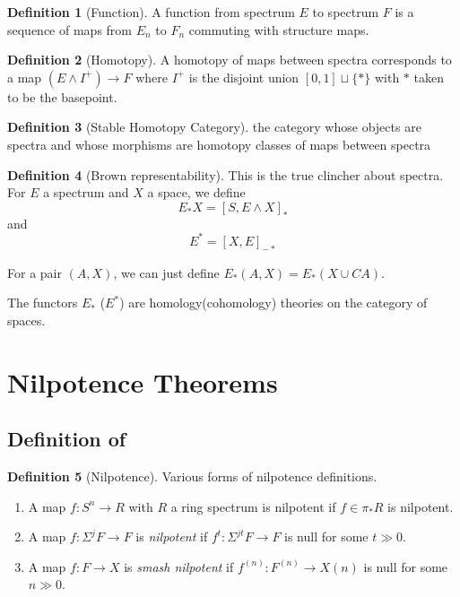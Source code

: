 \documentclass[11pt, oneside]{article}   	%
\theoremstyle{definition}
\newtheorem*{defn}{Definition}
\begin{document}
\begin{defn}[Function]
	A function from spectrum $E$ to spectrum $F$ is a sequence of maps from $E_n$ to $F_n$ commuting with structure maps.
\end{defn}

\begin{defn}[Homotopy]
	 A homotopy of maps between spectra corresponds to a map $(E\wedge I^+)\to F$ where $I^+$ is the disjoint union $[0,1]\sqcup \{*\}$ with $*$ taken to be the basepoint.
\end{defn}

\begin{defn}[Stable Homotopy Category]
	 the category whose objects are spectra and whose morphisms are homotopy classes of maps between spectra
\end{defn}

\begin{defn}[Brown representability]
	This is the true clincher about spectra. For $E$ a spectrum and $X$ a space, we define
	\begin{equation}
		E_*X=[S,E\wedge X]_*
	\end{equation}
	and
	\begin{equation}
		E^*=[X,E]_{-*}
	\end{equation}

	For a pair $(A,X)$, we can just define $E_*(A,X)=E_*(X\cup CA)$.

	The functors $E_*$ ($E^*$) are homology(cohomology) theories on the category of spaces.
\end{defn}

\section{Nilpotence Theorems}

\subsection{Definition of }

\begin{defn}[Nilpotence]
	Various forms of nilpotence definitions.

	\begin{enumerate}[1]
		\item A map $f:S^n\to R$ with $R$ a ring spectrum is nilpotent if $f\in \pi_*R$ is nilpotent.
		\item A map $f: \Sigma^jF\to F$ is \textit{nilpotent} if $f^t:\Sigma^{jt}F\to F$ is null for some $t\gg 0$.
		\item A map $f: F\to X$ is \textit{smash nilpotent} if $f^{(n)}:F^{(n)}\to X{(n)}$ is null for some $n\gg 0$.
	\end{enumerate}
\end{defn}
\end{document}
